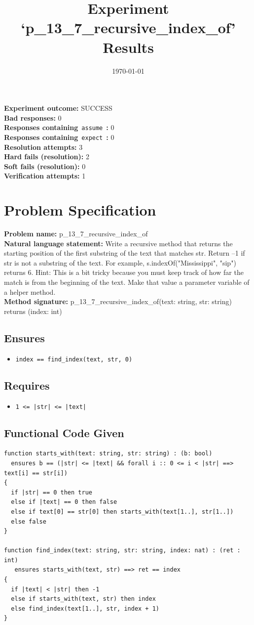 \documentclass{article}
\begin{document}
\title{Experiment `p\_13\_7\_recursive\_index\_of' Results}
\author{\today}
\date{}
\maketitle
\textbf{Experiment outcome: }SUCCESS
\\\textbf{Bad responses: }0
\\\textbf{Responses containing}~\texttt{assume}~\textbf{: }0
\\\textbf{Responses containing}~\texttt{expect}~\textbf{: }0
\\\textbf{Resolution attempts: }3
\\\textbf{Hard fails (resolution): }2
\\\textbf{Soft fails (resolution): }0
\\\textbf{Verification attempts: }1
\section*{Problem Specification}
\textbf{Problem name: }p\_13\_7\_recursive\_index\_of
\\\textbf{Natural language statement: }Write a recursive method that returns the starting position of the first substring of the text that matches str. Return –1 if str is not a substring of the text. For example, s.indexOf("Mississippi", "sip") returns 6. Hint: This is a bit tricky because you must keep track of how far the match is from the beginning of the text. Make that value a parameter variable of a helper method.
\\\textbf{Method signature: }p\_13\_7\_recursive\_index\_of(text: string, str: string) returns (index: int)
\subsection*{Ensures}
\begin{itemize}
\item \texttt{index == find\_index(text, str, 0)}
\end{itemize}
\subsection*{Requires}
\begin{itemize}
\item \texttt{1 <= |str| <= |text|}
\end{itemize}
\subsection*{Functional Code Given}
\begin{lstlisting}
function starts_with(text: string, str: string) : (b: bool)
  ensures b == (|str| <= |text| && forall i :: 0 <= i < |str| ==> text[i] == str[i])
{
  if |str| == 0 then true
  else if |text| == 0 then false
  else if text[0] == str[0] then starts_with(text[1..], str[1..])
  else false
}

function find_index(text: string, str: string, index: nat) : (ret : int)
   ensures starts_with(text, str) ==> ret == index 
{
  if |text| < |str| then -1
  else if starts_with(text, str) then index
  else find_index(text[1..], str, index + 1)
}
\end{lstlisting}
\clearpage
\end{document}
